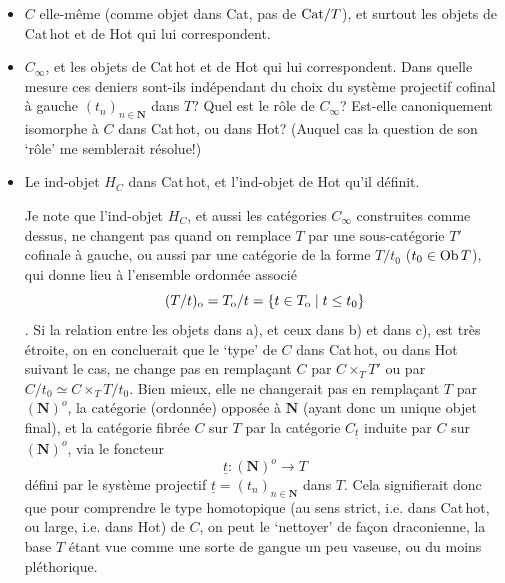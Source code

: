 \begin{itemize}[leftmargin=2.5em]
\item[\circled{a}] $C$ elle-même (comme objet dans Cat, pas de $\mathrm{Cat}/T$), et surtout les objets de Cat\,hot et de Hot qui lui correspondent.

\item[\circled{b}] $C_{\infty}$, et les objets de Cat\,hot et de Hot qui lui correspondent. Dans quelle mesure ces deniers %
sont-ils indépendant %
du choix du système projectif cofinal à gauche $(t_{n})_{n\in\mathbf{N}}$ dans $T$? Quel est le rôle de $C_{\infty}$? Est-elle canoniquement isomorphe à $C$ dans Cat\,hot, ou dans Hot? (Auquel cas la question de son ‘rôle' me semblerait résolue!)

\item[\circled{c}] Le ind-objet %
$H_{C}$ dans Cat\,hot, et l'ind-objet de Hot qu'il définit.

Je note que l'ind-objet $H_{C}$, et aussi les catégories $C_{\infty}$ construites comme dessus, ne changent pas quand on remplace $T$ par une sous-catégorie $T'$ cofinale à gauche, ou aussi par une catégorie de la forme $T/t_{0}$ ($t_{0} \in \mathrm{Ob}\, T$), qui donne lieu à l'ensemble ordonnée %
associé
\[
(T/t)_{\mathrm{o}} = T_{\mathrm{o}}/t = \{t \in T_{\mathrm{o}} \mid t \leq t_{0}\}
\]
. Si la relation entre les objets dans a), et ceux dans b) et dans c), est très étroite, on en concluerait %
que le ‘type' de $C$ dans Cat\,hot, ou dans Hot suivant le cas, ne change pas en remplaçant $C$ par
$C \times_{T} T'$ ou par $C/t_{0} \simeq C \times_{T} T/t_{0}$. Bien mieux, elle ne changerait pas en remplaçant $T$ par $(\mathbf{N})^{o}$, la catégorie (ordonnée) opposée à $\mathbf{N}$ (ayant donc un unique objet final), et la catégorie fibrée $C$ sur $T$ par la catégorie $C_{\underline{t}}$ induite par $C$ sur $(\mathbf{N})^{o}$, via le foncteur
\[
\underline{t} : (\mathbf{N})^{o} \longrightarrow T
\]
défini par le système projectif $\underline{t} = (t_{n})_{n\in\mathbf{N}}$ dans $T$. Cela signifierait donc que pour comprendre le type homotopique (au sens strict, i.e. dans Cat\,hot, ou large, i.e. dans Hot) de $C$, on peut le ‘nettoyer' de façon draconienne, la base $T$ étant vue comme une sorte de gangue un peu vaseuse, ou du moins pléthorique.


\end{itemize}
